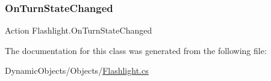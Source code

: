 \subsubsection{\texorpdfstring{On\+Turn\+State\+Changed}{OnTurnStateChanged}}
{\footnotesize\ttfamily Action Flashlight.\+On\+Turn\+State\+Changed}



The documentation for this class was generated from the following file\+:\begin{DoxyCompactItemize}
\item 
Dynamic\+Objects/\+Objects/\mbox{\hyperlink{_flashlight_8cs}{Flashlight.\+cs}}\end{DoxyCompactItemize}

